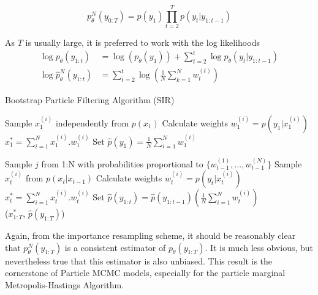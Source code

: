 \documentclass[11pt,a4,twosided,singlespacing,titlepagenumber=on]{scrreprt}
\numberwithin{equation}{chapter} %
\theoremstyle{remark}
\begin{document}
$$ p^N_{\theta}(y_{0:T}) = p(y_1)\prod_{t=2}^T p(y_t | y_{1:t-1})$$

As $T$ is usually large, it is preferred to work with the log likelihoods
\begin{align*}
\log p_{\theta}(y_{1:t}) &= \log(p_\theta(y_1)) + \sum_{t=2}^t \log p_\theta(y_t | y_{1:t-1}) \\
\log \hat{p}^N_{\theta}(y_{1:t}) &= \sum_{t=2}^t \log \left(\frac{1}{N} \sum_{k=1}^N w_t^{(t)} \right)
\end{align*}

\begin{algorithm}
\caption{Bootstrap Particle Filtering Algorithm (SIR)}\label{euclid}
\begin{algorithmic}[1]
	\State Sample $x_1^{(i)}$ independently from $p(x_1)$
	\State Calculate weights $w_1^{(i)} = p(y_1 | x_1^{(i)})$
\State $x^*_1 = \sum_{i=1}^N x_1^{(i)}.w_1^{(i)}$
\State Set $\hat{p}(y_1) = \frac{1}{N} \sum_{i=1}^N w_1^{(i)}$

		\State Sample $j$ from 1:N with probabilities proportional to $\{w_{t-1}^{(1)},..., w_{t-1}^{(N)}\}$
		\State Sample $x_t^{(i)}$ from $p(x_t|x_{t-1})$
		\State Calculate weights $w_t^{(i)} = p(y_t|x_t^{(i)})$
	\State $x^*_t = \sum_{i=1}^N x_t^{(i)}.w_t^{(i)}$
	\State Set $\hat{p}(y_{1:t}) = \hat{p}(y_{1:t-1}) \left(\frac{1}{N} \sum_{i=1}^N w_t^{(i)} \right)$
\\
\Return ($x^*_{1:T}$, $\hat{p}(y_{1:T})$)
\EndProcedure
\end{algorithmic}
\end{algorithm}

Again, from the importance resampling scheme, it should be reasonably clear that $p^N_{\theta}(y_{1:T})$ is a consistent estimator of $p_{\theta}(y_{1:T})$. It is much less obvious, but nevertheless true that this estimator is also unbiased. This result is the cornerstone of Particle MCMC models, especially for the particle marginal Metropolis-Hastings Algorithm.
\end{document}
